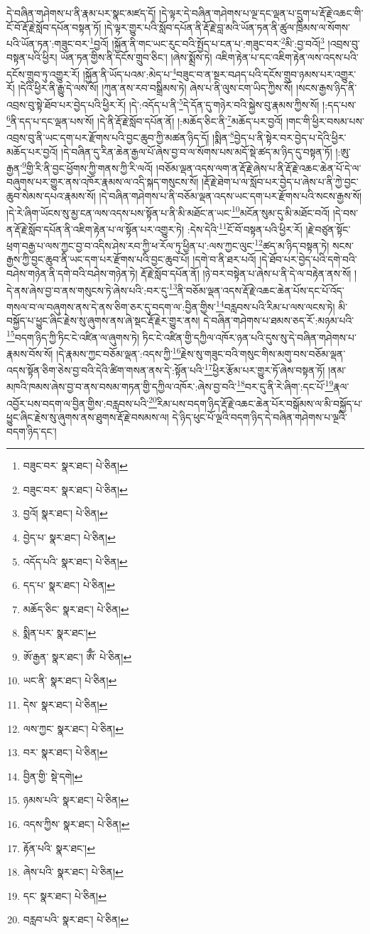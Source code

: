 དེ་བཞིན་གཤེགས་པ་ནི་རྣམ་པར་སྣང་མཛད་དོ། །དེ་ལྟར་དེ་བཞིན་གཤེགས་པ་ལྔ་དང་ལྡན་པ་དྲུག་པ་རྡོ་རྗེ་འཆང་གི་ངོ་བོ་རྡོ་རྗེ་སློབ་དཔོན་བསྟན་ཏོ། །དེ་ལྟར་གྱུར་པའི་སློབ་དཔོན་ནི་རྡོ་རྗེ་བླ་མའི་ཡོན་ཏན་ནི་ཚུལ་ཁྲིམས་ལ་སོགས་པའི་ཡོན་ཏན་:གཟུང་བར་\footnote{བཟུང་བར་  སྣར་ཐང་།  པེ་ཅིན། }བྱའོ། །སྐྱོན་ནི་གང་ཡང་རུང་བའི་སྤྱོད་པ་ངན་པ་:གཟུང་བར་\footnote{བཟུང་བར་  སྣར་ཐང་།  པེ་ཅིན། }མི་:བྱ་བའོ།\footnote{བྱའོ།  སྣར་ཐང་།  པེ་ཅིན། } །འབྲས་བུ་བསྟན་པའི་ཕྱིར། ཡོན་ཏན་གྱིས་ནི་དངོས་གྲུབ་ཅིང་། །ཞེས་སྨྲོས་ཏེ། འཇིག་རྟེན་པ་དང་འཇིག་རྟེན་ལས་འདས་པའི་དངོས་གྲུབ་ཏུ་འགྱུར་རོ། །སྐྱོན་ནི་ཡོད་པའམ་:མེད་པ་\footnote{བྱེད་པ་  སྣར་ཐང་།  པེ་ཅིན། }བཟུང་བ་ན་སྔར་བཤད་པའི་དངོས་གྲུབ་ཉམས་པར་འགྱུར་རོ། །དེའི་ཕྱིར་ནི་རྒྱུ་དེ་ལས་སོ། །ཀུན་ནས་རབ་བསྒྲིམས་ཏེ། ཞེས་པ་ནི་ལུས་ངག་ཡིད་ཀྱིས་སོ། །སངས་རྒྱས་ཉིད་ནི་འབྲས་བུ་སྟེ་ཐོབ་པར་བྱེད་པའི་ཕྱིར་རོ། །དེ་:འདོད་པ་ནི་\footnote{འདོད་པའི་  སྣར་ཐང་།  པེ་ཅིན། }དེ་དོན་དུ་གཉེར་བའི་སྐྱེས་བུ་རྣམས་ཀྱིས་སོ། །:དད་པས་\footnote{དད་པ་  སྣར་ཐང་།  པེ་ཅིན། }ནི་དད་པ་དང་ལྡན་པས་སོ། །དེ་ནི་རྡོ་རྗེ་སློབ་དཔོན་ནོ། །:མཆོད་ཅིང་ནི་\footnote{མཆོད་ཅིང་  སྣར་ཐང་།  པེ་ཅིན། }མཆོད་པར་བྱའོ། །གང་གི་ཕྱིར་བསམ་པས་འབྲས་བུ་ནི་ཡང་དག་པར་རྫོགས་པའི་བྱང་ཆུབ་ཀྱི་མཚན་ཉིད་དོ། །སྨིན་\footnote{སྨིན་པར་  སྣར་ཐང་། }བྱེད་པ་ནི་སྟེར་བར་བྱེད་པ་དེའི་ཕྱིར་མཆོད་པར་བྱའོ། །དེ་བཞིན་དུ་རིན་ཆེན་རྒྱལ་པོ་ཞེས་བྱ་བ་ལ་སོགས་པས་མདོ་སྡེ་ཚད་མ་ཉིད་དུ་བསྟན་ཏོ། །:ཨུ་རྒྱན་\footnote{ཨོ་རྒྱན་  སྣར་ཐང་། ཨོྃ་  པེ་ཅིན། }གྱི་རི་ནི་བྱང་ཕྱོགས་ཀྱི་གནས་ཀྱི་རི་ལའོ། །བཅོམ་ལྡན་འདས་ལག་ན་རྡོ་རྗེ་ཞེས་པ་ནི་རྡོ་རྗེ་འཆང་ཆེན་པོ་དེ་ལ་བཞུགས་པར་གྱུར་ནས་འཁོར་རྣམས་ལ་འདི་སྐད་གསུངས་སོ། །རྡོ་རྗེ་ཐེག་པ་ལ་སློབ་པར་བྱེད་པ་ཞེས་པ་ནི་ཀྱེ་བྱང་ཆུབ་སེམས་དཔའ་རྣམས་སོ། །དེ་བཞིན་གཤེགས་པ་ནི་བཅོམ་ལྡན་འདས་ཡང་དག་པར་རྫོགས་པའི་སངས་རྒྱས་སོ། །དེ་རེ་ཞིག་ཡོངས་སུ་མྱ་ངན་ལས་འདས་པས་སྟོན་པ་ནི་མི་མཐོང་ན་ཡང་\footnote{ཡང་ནི་  སྣར་ཐང་།  པེ་ཅིན། }མངོན་སུམ་དུ་མི་མཐོང་བའོ། །དེ་བས་ན་རྡོ་རྗེ་སློབ་དཔོན་ནི་འཇིག་རྟེན་པ་ལ་སྟོན་པར་འགྱུར་ཏེ། :དེས་དེའི་\footnote{དེས་  སྣར་ཐང་།  པེ་ཅིན། }ངོ་བོ་བསྟན་པའི་ཕྱིར་རོ། །རྗེ་བཙུན་སྟོང་ཕྲག་བརྒྱ་པ་ལས་ཀྱང་བྱ་བ་འདིས་ཤེས་རབ་ཀྱི་ཕ་རོལ་ཏུ་ཕྱིན་པ་:ལས་ཀྱང་ལུང་\footnote{ལས་ཀྱང་  སྣར་ཐང་།  པེ་ཅིན། }ཚད་མ་ཉིད་བསྟན་ཏེ། སངས་རྒྱས་ཀྱི་བྱང་ཆུབ་ནི་ཡང་དག་པར་རྫོགས་པའི་བྱང་ཆུབ་པོ། །དགེ་བ་ནི་ཐར་པའོ། །དེ་ཐོབ་པར་བྱེད་པའི་དགེ་བའི་བཤེས་གཉེན་ནི་དགེ་བའི་བཤེས་གཉེན་ཏེ། རྡོ་རྗེ་སློབ་དཔོན་ནོ། །ཉེ་བར་བསྟེན་པ་ཞེས་པ་ནི་དེ་ལ་བརྟེན་ནས་སོ། །དེ་ནས་ཞེས་བྱ་བ་ནས་གསུངས་ཏེ་ཞེས་པའི་:བར་དུ་\footnote{བར་  སྣར་ཐང་།  པེ་ཅིན། }ནི་བཅོམ་ལྡན་འདས་རྡོ་རྗེ་འཆང་ཆེན་པོས་དང་པོ་འོད་གསལ་བ་ལ་བཞུགས་ནས་དེ་ནས་ཅིག་ཅར་དུ་བདག་ལ་:བྱིན་གྱིས་\footnote{བྱིན་གྱི་  སྡེ་དགེ། }བརླབས་པའི་རིམ་པ་ལས་ལངས་ཏེ། མི་བསྐྱོད་པ་ཕྱུང་ཞིང་རྗེས་སུ་ཞུགས་ནས་ཞེ་སྡང་རྡོ་རྗེར་གྱུར་ནས། དེ་བཞིན་གཤེགས་པ་ཐམས་ཅད་རོ་:མཉམ་པའི་\footnote{ཉམས་པའི་  སྣར་ཐང་།  པེ་ཅིན། }བདག་ཉིད་ཀྱི་ཏིང་ངེ་འཛིན་ལ་ཞུགས་ཏེ། ཏིང་ངེ་འཛིན་གྱི་དཀྱིལ་འཁོར་ཉན་པའི་དུས་སུ་དེ་བཞིན་གཤེགས་པ་རྣམས་བོས་སོ། །དེ་རྣམས་ཀྱང་བཅོམ་ལྡན་:འདས་ཀྱི་\footnote{འདས་ཀྱིས་  སྣར་ཐང་།  པེ་ཅིན། }རྗེས་སུ་གཟུང་བའི་གསུང་གིས་མགུ་བས་བཅོམ་ལྡན་འདས་སྟོན་ཅིག་ཅེས་བྱ་བའི་དེའི་ཚིག་གསན་ནས་དེ་:སྟོན་པའི་\footnote{རྟོན་པའི་  སྣར་ཐང་། }ཕྱིར་རྩོམ་པར་གྱུར་ཏོ་ཞེས་བསྟན་ཏོ། །ནམ་མཁའི་ཁམས་ཞེས་བྱ་བ་ནས་བསམ་གཏན་གྱི་དཀྱིལ་འཁོར་:ཞེས་བྱ་བའི་\footnote{ཞེས་པའི་  སྣར་ཐང་།  པེ་ཅིན། }བར་དུ་ནི་རེ་ཞིག་:དང་པོ་\footnote{དང་  སྣར་ཐང་།  པེ་ཅིན། }རྣལ་འབྱོར་པས་བདག་ལ་བྱིན་གྱིས་:བརླབས་པའི་\footnote{བརླབ་པའི་  སྣར་ཐང་།  པེ་ཅིན། }རིམ་པས་བདག་ཉིད་རྡོ་རྗེ་འཆང་ཆེན་པོར་བསྒོམས་ལ་མི་བསྐྱོད་པ་ཕྱུང་ཞིང་རྗེས་སུ་ཞུགས་ནས་ཐུགས་རྡོ་རྗེ་བསམས་ལ། དེ་ཉིད་ཕུང་པོ་ལྔའི་བདག་ཉིད་དེ་བཞིན་གཤེགས་པ་ལྔའི་བདག་ཉིད་དང་། 